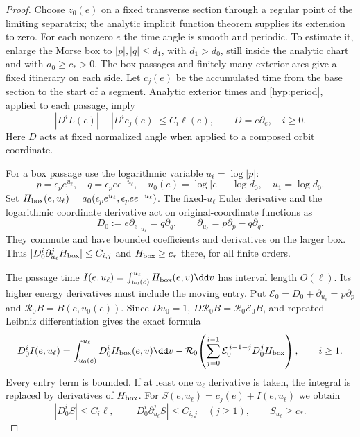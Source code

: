 \begin{proof}
Choose $z_0(e)$ on a fixed transverse section through a regular point
of the limiting separatrix; the analytic implicit function theorem
supplies its extension to zero.  For each nonzero $e$ the time angle
is smooth and periodic.  To estimate it, enlarge the Morse box to
$|p|,|q|\le d_1$, with $d_1>d_0$, still inside the analytic chart and
with $a_0\ge c_*>0$.  The box passages and finitely many exterior arcs
give a fixed itinerary on each side.  Let $c_j(e)$ be the accumulated
time from the base section to the start of a segment.  Analytic
exterior times and \eqref{hyp:period}, applied to each passage, imply
\begin{equation}\label{hyp:euler-times}
 |D^i L(e)|+|D^i c_j(e)|\le C_i\ell(e),\qquad
 D=e\partial_e,\quad i\ge0.
\end{equation}
Here $D$ acts at fixed normalized angle when applied to a composed
orbit coordinate.

For a box passage use the logarithmic variable $u_\ell=\log|p|$:
\[
 p=\epsilon_p e^{u_\ell},\quad
 q=\epsilon_p e e^{-u_\ell},\quad
 u_0(e)=\log|e|-\log d_0,\quad u_1=\log d_0.
\]
Set $H_{\rm box}(e,u_\ell)=a_0(\epsilon_p e^{u_\ell},\epsilon_p e e^{-u_\ell})$.
The fixed-$u_\ell$ Euler derivative and the logarithmic coordinate
derivative act on original-coordinate functions as
\[
 D_0:=e\partial_e|_{u_\ell}=q\partial_q,\qquad
 \partial_{u_\ell}=p\partial_p-q\partial_q.
\]
They commute and have bounded coefficients and derivatives on the
larger box.  Thus $|D_0^i\partial_{u_\ell}^jH_{\rm box}|\le C_{i,j}$ and $H_{\rm box}\ge c_*$
there, for all finite orders.

The passage time $I(e,u_\ell)=\int_{u_0(e)}^{u_\ell}H_{\rm box}(e,v)\dd v$ has interval
length $O(\ell)$.  Its higher energy derivatives must include the
moving entry.  Put $\mathcal E_0=D_0+\partial_{u_\ell}=p\partial_p$ and
$\mathcal R_0B=B(e,u_0(e))$.  Since $Du_0=1$,
$D\mathcal R_0B=\mathcal R_0\mathcal E_0B$, and repeated Leibniz
differentiation gives the exact formula
\begin{equation}\label{hyp:moving-entry}
 D_0^i I(e,u_\ell)=\int_{u_0(e)}^{u_\ell}D_0^iH_{\rm box}(e,v)\dd v
 -\mathcal R_0\!\left(
     \sum_{j=0}^{i-1}\mathcal E_0^{\,i-1-j}D_0^jH_{\rm box}\right),
 \qquad i\ge1.
\end{equation}
Every entry term is bounded.  If at least one $u_\ell$ derivative is taken,
the integral is replaced by derivatives of $H_{\rm box}$.  For
$S(e,u_\ell)=c_j(e)+I(e,u_\ell)$ we obtain
\begin{equation}\label{hyp:time-symbols}
 |D_0^iS|\le C_i\ell,\qquad
 |D_0^i\partial_{u_\ell}^jS|\le C_{i,j}\quad(j\ge1),\qquad S_{u_\ell}\ge c_*.
\end{equation}


\end{proof}
